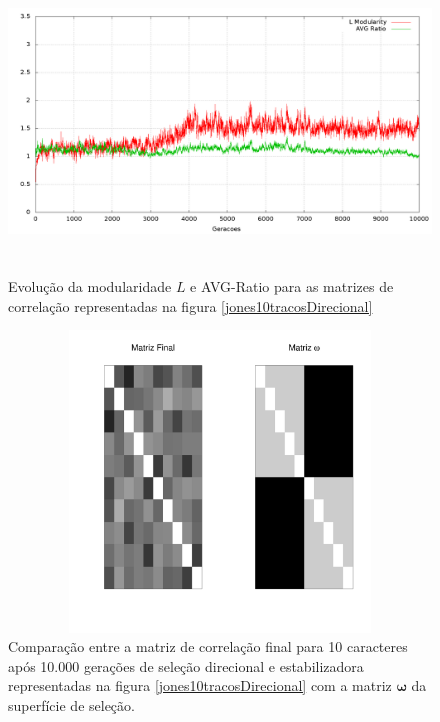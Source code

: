 \begin{figure}[htbp]
    \centering
    \includegraphics[width=150mm, height=80mm]{figuras/jones10tracosDirecionalStats.png}
    \caption{Evolução da modularidade $L$ e AVG-Ratio para as matrizes de
    correlação representadas na figura \ref{jones10tracosDirecional}}
    \label{jones10tracosDirecionalStats}
\end{figure}



\begin{figure}[htbp]
    \centering
    \includegraphics[width=150mm, height=80mm]{figuras/Mat10tracosDirecional}
    \caption{Comparação entre a matriz de correlação final para 10 caracteres
        após 10.000 gerações de seleção direcional e estabilizadora
        representadas na figura \ref{jones10tracosDirecional} com a matriz
    $\pmb{\omega}$ da superfície de seleção.}
    \label{MatJones10tracosDirecional}
\end{figure}


